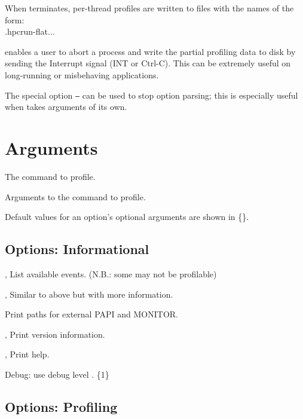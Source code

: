 \documentclass[english]{article}
\begin{document}
When  terminates, per-thread profiles are written to files with the names of the form:\\
\SP\SP\SP {}.hpcrun-flat...

 enables a user to abort a process and write the partial profiling data to disk by sending the Interrupt signal (INT or Ctrl-C).
This can be extremely useful on long-running or misbehaving applications.

The special option \texttt{--} can be used to stop  option parsing; this is especially useful when  takes arguments of its own.


\section{Arguments}

\begin{Description}
\item[\Arg{command}] The command to profile.
\item[\Arg{command-arguments}] Arguments to the command to profile.
\end{Description}

Default values for an option's optional arguments are shown in \{\}.

\subsection{Options: Informational}

\begin{Description}
\item[\Opt{-l}, \Opt{--list-events-short}] List available events. (N.B.: some may not be profilable)
\item[\Opt{-L}, \Opt{---list-events-long}] Similar to above but with more information.
\item[\Opt{--paths}] Print paths for external PAPI and MONITOR.
\item[\Opt{-V}, \Opt{--version}] Print version information.
\item[\Opt{-h}, \Opt{--help}] Print help.
\item[\OptoArg{--debug}{n}]   Debug: use debug level . \{1\}
\end{Description}

\subsection{Options: Profiling}
\end{document}
